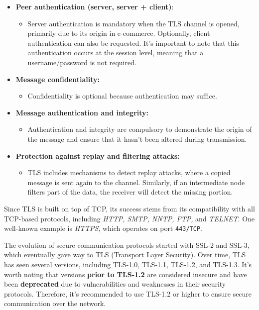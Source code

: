 \begin{itemize}
	\item \textbf{Peer authentication (server, server + client)}:
	      \begin{itemize}
		      \item Server authentication is mandatory when the TLS channel is opened, primarily due to its origin in e-commerce. Optionally, client authentication can also be requested. It's important to note that this authentication occurs at the session level, meaning that a username/password is not required.
	      \end{itemize}

	\item \textbf{Message confidentiality:}
	      \begin{itemize}
		      \item Confidentiality is optional because authentication may suffice.
	      \end{itemize}

	\item \textbf{Message authentication and integrity:}
	      \begin{itemize}
		      \item Authentication and integrity are compulsory to demonstrate the origin of the message and ensure that it hasn't been altered during transmission.
	      \end{itemize}

	\item \textbf{Protection against replay and filtering attacks:}
	      \begin{itemize}
		      \item TLS includes mechanisms to detect replay attacks, where a copied message is sent again to the channel. Similarly, if an intermediate node filters part of the data, the receiver will detect the missing portion.
	      \end{itemize}
\end{itemize}

Since TLS is built on top of TCP, its success stems from its compatibility with all TCP-based protocols, including \textit{HTTP, SMTP, NNTP, FTP,} and \textit{TELNET}. One well-known example is \textit{HTTPS}, which operates on port \texttt{443/TCP}.

The evolution of secure communication protocols started with SSL-2 and SSL-3, which eventually gave way to TLS (Transport Layer Security). Over time, TLS has seen several versions, including TLS-1.0, TLS-1.1, TLS-1.2, and TLS-1.3.
It's worth noting that versions \textbf{prior to TLS-1.2} are considered insecure and have been \textbf{deprecated} due to vulnerabilities and weaknesses in their security protocols. Therefore, it's recommended to use TLS-1.2 or higher to ensure secure communication over the network.


